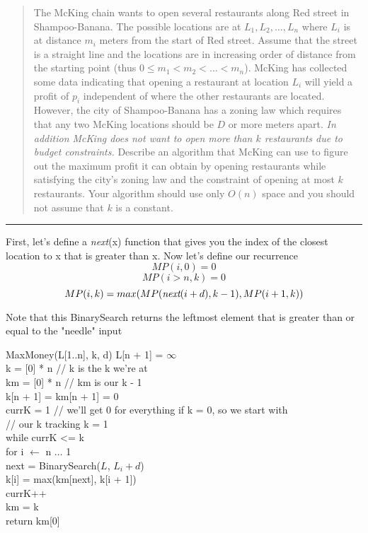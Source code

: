 \documentclass[11pt]{article}
\begin{document}



\begin{quote}
The McKing chain wants to open several restaurants along Red
  street in Shampoo-Banana. The possible locations are at $L_1,L_2,
  \ldots, L_n$ where $L_i$ is at distance $m_i$ meters from the start
  of Red street. Assume that the street is a straight line and the
  locations are in increasing order of distance from the starting
  point (thus $0 \leq m_1 < m_2 < \ldots < m_n$). McKing has collected
  some data indicating that opening a restaurant at location $L_i$
  will yield a profit of $p_i$ independent of where the other
  restaurants are located. However, the city of Shampoo-Banana has a
  zoning law which requires that any two McKing locations should be
  $D$ or more meters apart. {\em In addition McKing does not want to
    open more than $k$ restaurants due to budget constraints.}
  Describe an algorithm that McKing can use to figure out the maximum
  profit it can obtain by opening restaurants while satisfying the
  city's zoning law and the constraint of opening at most $k$
  restaurants.  Your algorithm should use only $O(n)$ space and you
  should not assume that $k$ is a constant.
\end{quote}
\hrule



\begin{solution}
    First, let's define a \emph{next}(x) function that gives you the index of the closest location to x that is greater than x.
    Now let's define our recurrence
    \[
    MP(i, 0) = 0
    \]
\[
    MP(i > n, k) = 0
    \]
\[
    MP(i, k) = max(MP(\emph{next}(i + d), k - 1), MP(i + 1, k))
    \]

    Note that this BinarySearch returns the leftmost element that is greater than or equal to the "needle" input
    \begin{algo}
        MaxMoney(L[1..n], k, d) \+
        L[n + 1] = $\infty$
        \\ k = [0] * n // k is the k we're at 
        \\ km = [0] * n // km is our k - 1 
        \\ k[n + 1] = km[n + 1] = 0
        \\ currK = 1 // we'll get 0 for everything if k = 0, so we start with 
        \\ // our k tracking k = 1
        \\ while currK <= k \+
        \\ for i $\gets$ n $\ldots$ 1 \+
        \\ next = BinarySearch($L$, $L_i + d$)
        \\ k[i] = max(km[next], k[i + 1]) \-
        \\ currK++
        \\ km = k \-
        \\ return km[0]
    \end{algo}
\end{solution}
\end{document}
